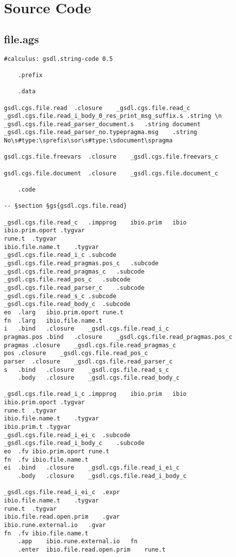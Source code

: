 \documentclass{report}
\begin{document}
\chapter{Source Code}

\section{file.ags}

\begin{verbatim}
#calculus: gsdl.string-code 0.5

	.prefix

	.data

gsdl.cgs.file.read	.closure	_gsdl.cgs.file.read_c
_gsdl.cgs.file.read_i_body_0_res_print_msg_suffix.s	.string	\n
_gsdl.cgs.file.read_parser_document.s	.string	document
_gsdl.cgs.file.read_parser_no.typepragma.msg	.string	No\s#type:\sprefix\sor\s#type:\sdocument\spragma

gsdl.cgs.file.freevars	.closure	_gsdl.cgs.file.freevars_c

gsdl.cgs.file.document	.closure	_gsdl.cgs.file.document_c

	.code

-- §section §gs{gsdl.cgs.file.read}

_gsdl.cgs.file.read_c	.impprog	ibio.prim	ibio
ibio.prim.oport	.tygvar
rune.t	.tygvar
ibio.file.name.t	.tygvar
_gsdl.cgs.file.read_i_c	.subcode
_gsdl.cgs.file.read_pragmas.pos_c	.subcode
_gsdl.cgs.file.read_pragmas_c	.subcode
_gsdl.cgs.file.read_pos_c	.subcode
_gsdl.cgs.file.read_parser_c	.subcode
_gsdl.cgs.file.read_s_c	.subcode
_gsdl.cgs.file.read_body_c	.subcode
eo	.larg	ibio.prim.oport	rune.t
fn	.larg	ibio.file.name.t
i	.bind	.closure	_gsdl.cgs.file.read_i_c
pragmas.pos	.bind	.closure	_gsdl.cgs.file.read_pragmas.pos_c
pragmas	.closure	_gsdl.cgs.file.read_pragmas_c
pos	.closure	_gsdl.cgs.file.read_pos_c
parser	.closure	_gsdl.cgs.file.read_parser_c
s	.bind	.closure	_gsdl.cgs.file.read_s_c
	.body	.closure	_gsdl.cgs.file.read_body_c

_gsdl.cgs.file.read_i_c	.impprog	ibio.prim	ibio
ibio.prim.oport	.tygvar
rune.t	.tygvar
ibio.file.name.t	.tygvar
ibio.prim.t	.tygvar
_gsdl.cgs.file.read_i_ei_c	.subcode
_gsdl.cgs.file.read_i_body_c	.subcode
eo	.fv	ibio.prim.oport	rune.t
fn	.fv	ibio.file.name.t
ei	.bind	.closure	_gsdl.cgs.file.read_i_ei_c
	.body	.closure	_gsdl.cgs.file.read_i_body_c

_gsdl.cgs.file.read_i_ei_c	.expr
ibio.file.name.t	.tygvar
rune.t	.tygvar
ibio.file.read.open.prim	.gvar
ibio.rune.external.io	.gvar
fn	.fv	ibio.file.name.t
	.app	ibio.rune.external.io	fn
	.enter	ibio.file.read.open.prim	rune.t


\end{verbatim}
\end{document}
